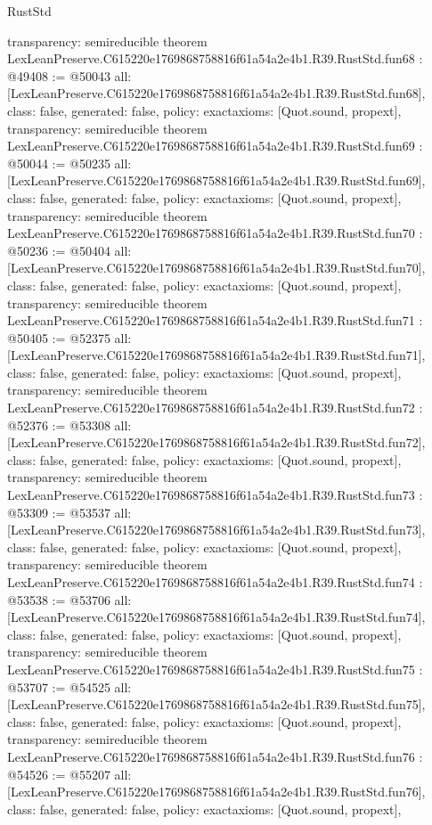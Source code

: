 \begin{lexlean}{RustStd}
\begin{coremodule}
{  transparency: semireducible
}
theorem LexLeanPreserve.C615220e1769868758816f61a54a2e4b1.R39.RustStd.fun68 : @49408 := @50043 {
  all: [LexLeanPreserve.C615220e1769868758816f61a54a2e4b1.R39.RustStd.fun68],
  class: false,
  generated: false,
  policy: exact{axioms: [Quot.sound, propext]},
  transparency: semireducible
}
theorem LexLeanPreserve.C615220e1769868758816f61a54a2e4b1.R39.RustStd.fun69 : @50044 := @50235 {
  all: [LexLeanPreserve.C615220e1769868758816f61a54a2e4b1.R39.RustStd.fun69],
  class: false,
  generated: false,
  policy: exact{axioms: [Quot.sound, propext]},
  transparency: semireducible
}
theorem LexLeanPreserve.C615220e1769868758816f61a54a2e4b1.R39.RustStd.fun70 : @50236 := @50404 {
  all: [LexLeanPreserve.C615220e1769868758816f61a54a2e4b1.R39.RustStd.fun70],
  class: false,
  generated: false,
  policy: exact{axioms: [Quot.sound, propext]},
  transparency: semireducible
}
theorem LexLeanPreserve.C615220e1769868758816f61a54a2e4b1.R39.RustStd.fun71 : @50405 := @52375 {
  all: [LexLeanPreserve.C615220e1769868758816f61a54a2e4b1.R39.RustStd.fun71],
  class: false,
  generated: false,
  policy: exact{axioms: [Quot.sound, propext]},
  transparency: semireducible
}
theorem LexLeanPreserve.C615220e1769868758816f61a54a2e4b1.R39.RustStd.fun72 : @52376 := @53308 {
  all: [LexLeanPreserve.C615220e1769868758816f61a54a2e4b1.R39.RustStd.fun72],
  class: false,
  generated: false,
  policy: exact{axioms: [Quot.sound, propext]},
  transparency: semireducible
}
theorem LexLeanPreserve.C615220e1769868758816f61a54a2e4b1.R39.RustStd.fun73 : @53309 := @53537 {
  all: [LexLeanPreserve.C615220e1769868758816f61a54a2e4b1.R39.RustStd.fun73],
  class: false,
  generated: false,
  policy: exact{axioms: [Quot.sound, propext]},
  transparency: semireducible
}
theorem LexLeanPreserve.C615220e1769868758816f61a54a2e4b1.R39.RustStd.fun74 : @53538 := @53706 {
  all: [LexLeanPreserve.C615220e1769868758816f61a54a2e4b1.R39.RustStd.fun74],
  class: false,
  generated: false,
  policy: exact{axioms: [Quot.sound, propext]},
  transparency: semireducible
}
theorem LexLeanPreserve.C615220e1769868758816f61a54a2e4b1.R39.RustStd.fun75 : @53707 := @54525 {
  all: [LexLeanPreserve.C615220e1769868758816f61a54a2e4b1.R39.RustStd.fun75],
  class: false,
  generated: false,
  policy: exact{axioms: [Quot.sound, propext]},
  transparency: semireducible
}
theorem LexLeanPreserve.C615220e1769868758816f61a54a2e4b1.R39.RustStd.fun76 : @54526 := @55207 {
  all: [LexLeanPreserve.C615220e1769868758816f61a54a2e4b1.R39.RustStd.fun76],
  class: false,
  generated: false,
  policy: exact{axioms: [Quot.sound, propext]},
}
\end{coremodule}
\end{lexlean}
